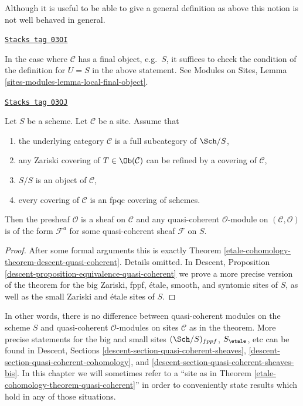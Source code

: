 Although it is useful to be able to give a general definition as above
this notion is not well behaved in general.

\begin{remark}
\label{etale-cohomology-remark-final-object}
\href{https://stacks.math.columbia.edu/tag/03OI}{\texttt{Stacks tag 03OI}}

In the case where $\mathcal{C}$ has a final object, e.g.\ $S$, it
suffices to check the condition of the definition for
$U = S$ in the above statement. See
Modules on Sites, Lemma \ref{sites-modules-lemma-local-final-object}.
\end{remark}

\begin{theorem}

\label{etale-cohomology-theorem-quasi-coherent}
\href{https://stacks.math.columbia.edu/tag/03OJ}{\texttt{Stacks tag 03OJ}}

Let $S$ be a scheme.
Let $\mathcal{C}$ be a site. Assume that
\begin{enumerate}
\item the underlying category $\mathcal{C}$ is a
full subcategory of $\Sch/S$,
\item any Zariski covering of $T \in \Ob(\mathcal{C})$
can be refined by a covering of $\mathcal{C}$,
\item $S/S$ is an object of $\mathcal{C}$,
\item every covering of $\mathcal{C}$ is an fpqc covering of schemes.
\end{enumerate}
Then the presheaf $\mathcal{O}$ is a sheaf on $\mathcal{C}$ and
any quasi-coherent $\mathcal{O}$-module on $(\mathcal{C}, \mathcal{O})$
is of the form $\mathcal{F}^a$ for some quasi-coherent sheaf
$\mathcal{F}$ on $S$.
\end{theorem}

\begin{proof}
After some formal arguments this is exactly Theorem
\ref{etale-cohomology-theorem-descent-quasi-coherent}. Details omitted. In
Descent, Proposition \ref{descent-proposition-equivalence-quasi-coherent}
we prove a more precise version of the theorem for the
big Zariski, fppf, \'etale, smooth, and syntomic sites of $S$,
as well as the small Zariski and \'etale sites of $S$.
\end{proof}

In other words, there is no difference between quasi-coherent
modules on the scheme $S$ and quasi-coherent $\mathcal{O}$-modules
on sites $\mathcal{C}$ as in the theorem. More precise statements
for the big and small sites $(\Sch/S)_{fppf}$, $S_\etale$, etc
can be found in Descent, Sections
\ref{descent-section-quasi-coherent-sheaves},
\ref{descent-section-quasi-coherent-cohomology}, and
\ref{descent-section-quasi-coherent-sheaves-bis}.
In this chapter we will sometimes refer to a
``site as in Theorem \ref{etale-cohomology-theorem-quasi-coherent}''
in order to conveniently state results which hold in any of those
situations.

